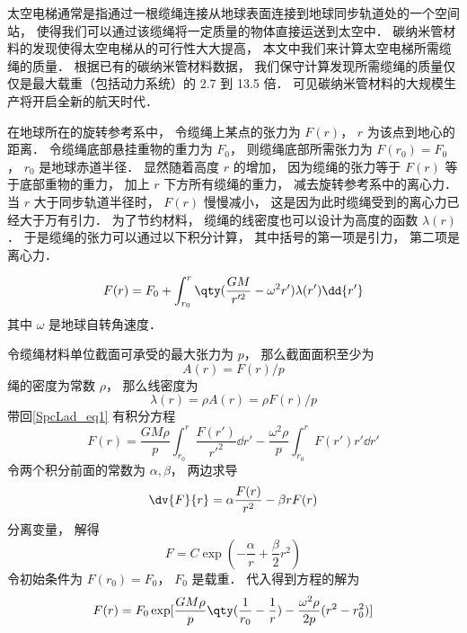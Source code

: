 

太空电梯通常是指通过一根缆绳连接从地球表面连接到地球同步轨道处的一个空间站， 使得我们可以通过该缆绳将一定质量的物体直接运送到太空中． 碳纳米管材料的发现使得太空电梯从的可行性大大提高， 本文中我们来计算太空电梯所需缆绳的质量． 根据已有的碳纳米管材料数据， 我们保守计算发现所需缆绳的质量仅仅是最大载重（包括动力系统）的 2.7 到 13.5 倍． 可见碳纳米管材料的大规模生产将开启全新的航天时代．

在地球所在的旋转参考系中， 令缆绳上某点的张力为 $F(r)$， $r$ 为该点到地心的距离． 令缆绳底部悬挂重物的重力为 $F_0$， 则缆绳底部所需张力为 $F(r_0) = F_0$， $r_0$ 是地球赤道半径． 显然随着高度 $r$ 的增加， 因为缆绳的张力等于 $F(r)$ 等于底部重物的重力， 加上 $r$ 下方所有缆绳的重力， 减去旋转参考系中的离心力． 当 $r$ 大于同步轨道半径时， $F(r)$ 慢慢减小， 这是因为此时缆绳受到的离心力已经大于万有引力． 为了节约材料， 缆绳的线密度也可以设计为高度的函数 $\lambda(r)$． 于是缆绳的张力可以通过以下积分计算， 其中括号的第一项是引力， 第二项是离心力．

\begin{equation}\label{SpcLad_eq1}
F(r) = F_0 + \int_{r_0}^{r} \qty(\frac{GM}{r'^2} - \omega^2 r') \lambda(r') \dd{r'}
\end{equation}
其中 $\omega$ 是地球自转角速度．

令缆绳材料单位截面可承受的最大张力为 $p$， 那么截面面积至少为
\begin{equation}
A(r) = F(r)/p
\end{equation}
绳的密度为常数 $\rho$， 那么线密度为
\begin{equation}
\lambda(r) = \rho A(r) = \rho F(r)/p
\end{equation}
带回\autoref{SpcLad_eq1} 有积分方程
\begin{equation}
F(r) = \frac{GM\rho}{p} \int_{r_0}^{r} \frac{F(r')}{r'^2} \dd{r'} - \frac{\omega^2\rho}{p}\int_{r_0}^r F(r') r' \dd{r'}
\end{equation}
令两个积分前面的常数为 $\alpha, \beta$， 两边求导
\begin{equation}
\dv{F}{r} = \alpha \frac{F(r)}{r^2} - \beta r F(r)
\end{equation}
分离变量， 解得
\begin{equation}
F = C\exp(-\frac{\alpha}{r} + \frac{\beta}{2} r^2)
\end{equation}
令初始条件为 $F(r_0) = F_0$， $F_0$ 是载重． 代入得到方程的解为
\begin{equation}
F(r) = F_0 \exp[\frac{GM\rho}{p} \qty(\frac{1}{r_0} - \frac{1}{r}) - \frac{\omega^2\rho}{2p}(r^2 - r_0^2)]
\end{equation}

